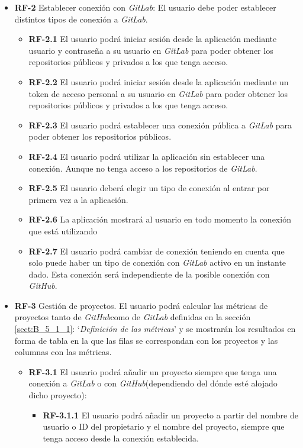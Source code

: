 \begin{itemize}
\begin{itemize}
	\end{itemize}
	\item \textbf{RF-2} Establecer conexión con \textit{GitLab}: El usuario debe poder establecer distintos tipos de conexión a \textit{GitLab}.
	\begin{itemize}
		\item \textbf{RF-2.1} El usuario podrá iniciar sesión desde la aplicación mediante usuario y contraseña a su usuario en \textit{GitLab} para poder obtener los repositorios públicos y privados a los que tenga acceso.
		\item \textbf{RF-2.2} El usuario podrá iniciar sesión desde la aplicación mediante un token de acceso personal a su usuario en \textit{GitLab} para poder obtener los repositorios públicos y privados a los que tenga acceso.
		\item \textbf{RF-2.3} El usuario podrá establecer una conexión pública a \textit{GitLab} para poder obtener los repositorios públicos.
		\item \textbf{RF-2.4} El usuario podrá utilizar la aplicación sin establecer una conexión. Aunque no tenga acceso a los repositorios de \textit{GitLab}.
		\item \textbf{RF-2.5} El usuario deberá elegir un tipo de conexión al entrar por primera vez a la aplicación.
		\item \textbf{RF-2.6} La aplicación mostrará al usuario en todo momento la conexión que está utilizando
		\item \textbf{RF-2.7} El usuario podrá cambiar de conexión teniendo en cuenta que solo puede haber un tipo de conexión con \textit{GitLab} activo en un instante dado. Esta conexión será independiente de la posible conexión con \textit{GitHub}.
	\end{itemize}
	\item \textbf{RF-3} Gestión de proyectos. El usuario podrá calcular las métricas de proyectos tanto de \textit{GitHub}como de \textit{GitLab} definidas en la sección \ref{sect:B_5_1_1}: `\textit{Definición de las métricas}' y se mostrarán los resultados en forma de tabla en la que las filas se correspondan con los proyectos y las columnas con las métricas.
	\begin{itemize}
		\item \textbf{RF-3.1} El usuario podrá añadir un proyecto siempre que tenga una conexión a \textit{GitLab} o con \textit{GitHub}(dependiendo del dónde esté alojado dicho proyecto):
		\begin{itemize}
			\item \textbf{RF-3.1.1} El usuario podrá añadir un proyecto a partir del nombre de usuario o ID del propietario y el nombre del proyecto, siempre que tenga acceso desde la conexión establecida.

\end{itemize}
\end{itemize}
\end{itemize}
